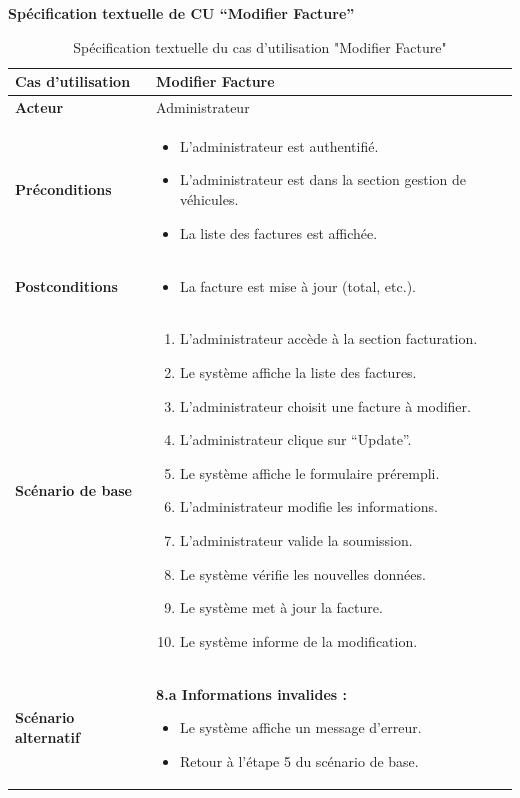 \documentclass[a4paper,11pt]{report}
\begin{document}
\endgroup

\newpage
\textbf{Spécification textuelle de CU “Modifier Facture”}
\begin{table}[H]
  \centering
  \renewcommand{\arraystretch}{1.5}
  \caption{Spécification textuelle du cas d'utilisation "Modifier Facture"}
  \begin{tabularx}{\textwidth}{|l|X|}
    \hline
    \textbf{Cas d'utilisation} & Modifier Facture \\ \hline
    \textbf{Acteur}            & Administrateur \\ \hline
    \textbf{Préconditions}     & 
      \begin{itemize}
        \item L’administrateur est authentifié.
        \item L'administrateur est dans la section gestion de véhicules.
        \item La liste des factures est affichée.
      \end{itemize} \\ \hline
    \textbf{Postconditions}    & 
      \begin{itemize}
        \item La facture est mise à jour (total, etc.).
      \end{itemize} \\ \hline
    \textbf{Scénario de base}  & 
      \begin{enumerate}
        \item L’administrateur accède à la section facturation.
        \item Le système affiche la liste des factures.
        \item L'administrateur choisit une facture à modifier.
        \item L'administrateur clique sur “Update”.
        \item Le système affiche le formulaire prérempli.
        \item L'administrateur modifie les informations.
        \item L'administrateur valide la soumission.
        \item Le système vérifie les nouvelles données.
        \item Le système met à jour la facture.
        \item Le système informe de la modification.
      \end{enumerate} \\ \hline
    \textbf{Scénario alternatif} & 
      \textbf{8.a Informations invalides :}
      \begin{itemize}
        \item Le système affiche un message d’erreur.
        \item Retour à l’étape 5 du scénario de base.
      \end{itemize} \\ \hline
  \end{tabularx}
\end{table}
\end{document}
